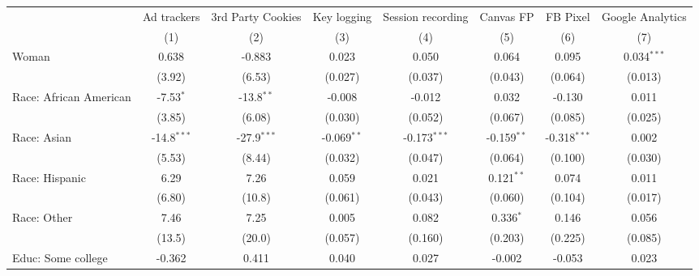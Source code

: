 
\begingroup
\centering
\begin{adjustbox}{width = \textwidth, center}
   \begin{tabular}{lccccccc}
      \toprule
                              & Ad trackers   & 3rd Party Cookies & Key logging   & Session recording & Canvas FP     & FB Pixel       & Google Analytics \\   
                              & (1)           & (2)               & (3)           & (4)               & (5)           & (6)            & (7)\\  
      \midrule 
      Woman                   & 0.638         & -0.883            & 0.023         & 0.050             & 0.064         & 0.095          & 0.034$^{***}$\\   
                              & (3.92)        & (6.53)            & (0.027)       & (0.037)           & (0.043)       & (0.064)        & (0.013)\\   
      Race: African American  & -7.53$^{*}$   & -13.8$^{**}$      & -0.008        & -0.012            & 0.032         & -0.130         & 0.011\\   
                              & (3.85)        & (6.08)            & (0.030)       & (0.052)           & (0.067)       & (0.085)        & (0.025)\\   
      Race: Asian             & -14.8$^{***}$ & -27.9$^{***}$     & -0.069$^{**}$ & -0.173$^{***}$    & -0.159$^{**}$ & -0.318$^{***}$ & 0.002\\   
                              & (5.53)        & (8.44)            & (0.032)       & (0.047)           & (0.064)       & (0.100)        & (0.030)\\   
      Race: Hispanic          & 6.29          & 7.26              & 0.059         & 0.021             & 0.121$^{**}$  & 0.074          & 0.011\\   
                              & (6.80)        & (10.8)            & (0.061)       & (0.043)           & (0.060)       & (0.104)        & (0.017)\\   
      Race: Other             & 7.46          & 7.25              & 0.005         & 0.082             & 0.336$^{*}$   & 0.146          & 0.056\\   
                              & (13.5)        & (20.0)            & (0.057)       & (0.160)           & (0.203)       & (0.225)        & (0.085)\\   
      Educ: Some college      & -0.362        & 0.411             & 0.040         & 0.027             & -0.002        & -0.053         & 0.023\\   

\end{tabular}
\end{adjustbox}
